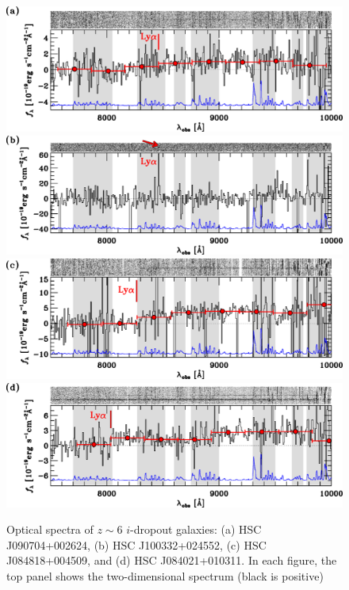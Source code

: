 \documentclass[]{pasj01}
\begin{document}
\begin{figure}
 \begin{center}
  \includegraphics[width=15cm]{S15B_izy_Y5.eps} 
  \includegraphics[width=15cm]{S15B_iz_1_7_9357.eps} 
  \includegraphics[width=15cm]{S16As_izy_1.eps} 
  \includegraphics[width=15cm]{S15B_izy_Y3.eps} 
 \end{center}
\caption{
Optical spectra of $z \sim 6$ $i$-dropout galaxies: 
(a) HSC J090704+002624, 
(b) HSC J100332+024552, 
(c) HSC J084818+004509, 
and 
(d) HSC J084021+010311.  
In each figure, 
the top panel shows the two-dimensional spectrum (black is positive) 
}
\end{figure}
\end{document}
